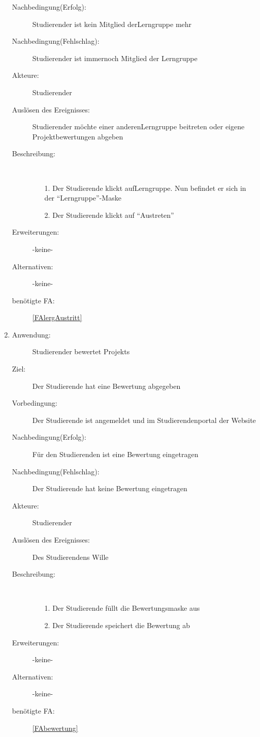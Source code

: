 \documentclass[parskip=full]{scrartcl}
\newcommand{\swtLabel}[1]{\textbf{/#1\arabic*0/}}
\begin{document}
\begin{enumerate}[label=\swtLabel{S}]
\begin{description}
  	\item[Nachbedingung(Erfolg):] Studierender ist kein Mitglied der\gls{Lerngruppe}
  	mehr
  	
  	\item[Nachbedingung(Fehlschlag):] Studierender ist immernoch Mitglied der
  	Lerngruppe
  	\item[Akteure:] Studierender
  	\item[Auslösen des Ereignisses:] Studierender möchte einer anderen\gls{Lerngruppe}
  	beitreten oder eigene Projektbewertungen abgeben
  	\item[Beschreibung:]~
  	\begin{enumerate}
  	  \item[1.] Der Studierende klickt auf\gls{Lerngruppe}. Nun befindet er sich in
  	  der \enquote{Lerngruppe}-Maske %
  	  \item[2.] Der Studierende klickt auf \enquote{Austreten}
 
  	\end{enumerate}
  	\item[Erweiterungen:] -keine-

  	\item[Alternativen:] -keine-

  	 \item[benötigte FA:] \ref{FAlergAustritt}
  \end{description}
%   
  
  \item
  \begin{description}
  \item[Anwendung:] Studierender bewertet \glspl{Projekt}
  \item[Ziel:] Der Studierende hat eine Bewertung abgegeben
  	\item[Vorbedingung:] Der Studierende ist angemeldet und im Studierendenportal der
  	Website
  	\item[Nachbedingung(Erfolg):] Für den Studierenden ist eine Bewertung
  	eingetragen
  	\item[Nachbedingung(Fehlschlag):] Der Studierende hat keine Bewertung eingetragen
  	\item[Akteure:] Studierender
  	\item[Auslösen des Ereignisses:] Des Studierendens Wille
  	\item[Beschreibung:]~
  	 \begin{enumerate}
  	   \item[1.] Der Studierende füllt die Bewertungsmaske aus %
  	   \item[2.] Der Studierende speichert die Bewertung ab
  	 \end{enumerate}
  	\item[Erweiterungen:] -keine-
  	\item[Alternativen:] -keine-
  	\item[benötigte FA:] \ref{FAbewertung}
  \end{description}
   

\end{enumerate}
\end{document}
